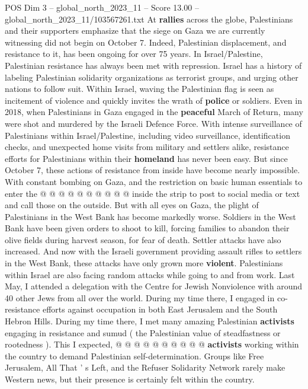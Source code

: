\begin{textsample}{POS Dim 3 – global\_north\_2023\_11 – Score 13.00 – global\_north\_2023\_11/103567261.txt}  \label{ex:f3_pos_174}
At \textbf{rallies} across the globe, Palestinians and their supporters emphasize that the siege on Gaza we are currently witnessing did not begin on October 7.
Indeed, Palestinian displacement, and resistance to it, has been ongoing for over 75 years.
In Israel/Palestine, Palestinian resistance has always been met with repression.
Israel has a history of labeling Palestinian solidarity organizations as terrorist groups, and urging other nations to follow suit.
Within Israel, waving the Palestinian flag is seen as incitement of violence and quickly invites the wrath of \textbf{police} or soldiers.
Even in 2018, when Palestinians in Gaza engaged in the \textbf{peaceful} March of Return, many were shot and murdered by the Israeli Defence Force.
With intense surveillance of Palestinians within Israel/Palestine, including video surveillance, identification checks, and unexpected home visits from military and settlers alike, resistance efforts for Palestinians within their \textbf{homeland} has never been easy.
But since October 7, these actions of resistance from inside have become nearly impossible.
With constant bombing on Gaza, and the restriction on basic human essentials to enter the @ @ @ @ @ @ @ @ @ @ inside the strip to post to social media or text and call those on the outside.
But with all eyes on Gaza, the plight of Palestinians in the West Bank has become markedly worse.
Soldiers in the West Bank have been given orders to shoot to kill, forcing families to abandon their olive fields during harvest season, for fear of death.
Settler attacks have also increased.
And now with the Israeli government providing assault rifles to settlers in the West Bank, these attacks have only grown more \textbf{violent}.
Palestinians within Israel are also facing random attacks while going to and from work.
Last May, I attended a delegation with the Centre for Jewish Nonviolence with around 40 other Jews from all over the world.
During my time there, I engaged in co-resistance efforts against occupation in both East Jerusalem and the South Hebron Hills.
During my time there, I met many amazing Palestinian \textbf{activists} engaging in resistance and sumud ( the Palestinian value of steadfastness or rootedness ).
This I expected, @ @ @ @ @ @ @ @ @ @ \textbf{activists} working within the country to demand Palestinian self-determination.
Groups like Free Jerusalem, All That ' s Left, and the Refuser Solidarity Network rarely make Western news, but their presence is certainly felt within the country.

\end{textsample}
